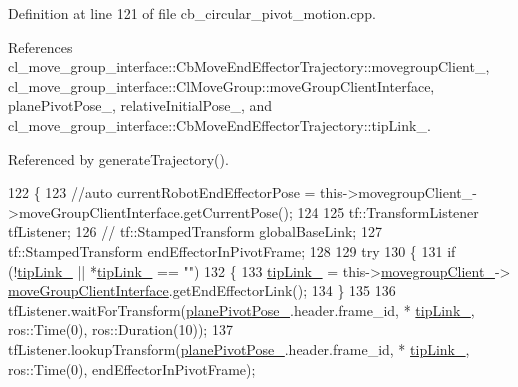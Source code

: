 Definition at line 121 of file cb\+\_\+circular\+\_\+pivot\+\_\+motion.\+cpp.



References cl\+\_\+move\+\_\+group\+\_\+interface\+::\+Cb\+Move\+End\+Effector\+Trajectory\+::movegroup\+Client\+\_\+, cl\+\_\+move\+\_\+group\+\_\+interface\+::\+Cl\+Move\+Group\+::move\+Group\+Client\+Interface, plane\+Pivot\+Pose\+\_\+, relative\+Initial\+Pose\+\_\+, and cl\+\_\+move\+\_\+group\+\_\+interface\+::\+Cb\+Move\+End\+Effector\+Trajectory\+::tip\+Link\+\_\+.



Referenced by generate\+Trajectory().


\begin{DoxyCode}
122     \{
123         \textcolor{comment}{//auto currentRobotEndEffectorPose =
       this->movegroupClient\_->moveGroupClientInterface.getCurrentPose();}
124 
125         tf::TransformListener tfListener;
126         \textcolor{comment}{// tf::StampedTransform globalBaseLink;}
127         tf::StampedTransform endEffectorInPivotFrame;
128 
129         \textcolor{keywordflow}{try}
130         \{
131             \textcolor{keywordflow}{if} (!\hyperlink{classcl__move__group__interface_1_1CbMoveEndEffectorTrajectory_a24c6c30b9b0761a61fa002d947bd3e11}{tipLink\_} || *\hyperlink{classcl__move__group__interface_1_1CbMoveEndEffectorTrajectory_a24c6c30b9b0761a61fa002d947bd3e11}{tipLink\_} == \textcolor{stringliteral}{""})
132             \{
133                 \hyperlink{classcl__move__group__interface_1_1CbMoveEndEffectorTrajectory_a24c6c30b9b0761a61fa002d947bd3e11}{tipLink\_} = this->\hyperlink{classcl__move__group__interface_1_1CbMoveEndEffectorTrajectory_aea650d3e7836125b32be97392b71a7f3}{movegroupClient\_}->
      \hyperlink{classcl__move__group__interface_1_1ClMoveGroup_a92922ea689e4e1b7b91512c56629c95b}{moveGroupClientInterface}.getEndEffectorLink();
134             \}
135 
136             tfListener.waitForTransform(\hyperlink{classcl__move__group__interface_1_1CbCircularPivotMotion_a0994efbe93b9f9a61fcf3703c360cda2}{planePivotPose\_}.header.frame\_id, *
      \hyperlink{classcl__move__group__interface_1_1CbMoveEndEffectorTrajectory_a24c6c30b9b0761a61fa002d947bd3e11}{tipLink\_}, ros::Time(0), ros::Duration(10));
137             tfListener.lookupTransform(\hyperlink{classcl__move__group__interface_1_1CbCircularPivotMotion_a0994efbe93b9f9a61fcf3703c360cda2}{planePivotPose\_}.header.frame\_id, *
      \hyperlink{classcl__move__group__interface_1_1CbMoveEndEffectorTrajectory_a24c6c30b9b0761a61fa002d947bd3e11}{tipLink\_}, ros::Time(0), endEffectorInPivotFrame);

\end{DoxyCode}
